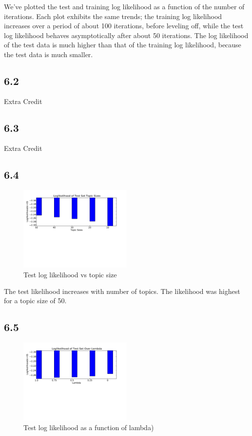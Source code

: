 \documentclass{article}
\begin{document}
We've plotted the test and training log likelihood as a function of
the number of iterations. Each plot exhibits the same trends; the training log likelihood increases over a period
of about 100 iterations, before leveling off, while the test log likelihood behaves asymptotically after about 50 iterations. The
log likelihood of the test data is much higher than that of the training log likelihood, because the test data is much smaller.

\subsection*{6.2}

Extra Credit

\subsection*{6.3}

Extra Credit

\subsection*{6.4}
\begin{figure}[H]
  \caption{Test log likelihood vs topic size}
  \centering
    \includegraphics[width=0.5\textwidth]{q6_p4.pdf}
\end{figure}
The test likelihood increases with number of topics. The likelihood was highest for a topic size of 50.

\subsection*{6.5}
\begin{figure}[H]
  \caption{Test log likelihood as a function of lambda)}
  \centering
    \includegraphics[width=0.5\textwidth]{q6_p5.pdf}
\end{figure}
\end{document}
